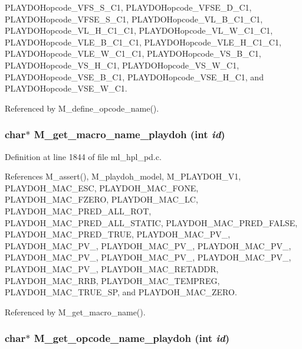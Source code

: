 PLAYDOHopcode\_\-VFS\_\-S\_\-C1, PLAYDOHopcode\_\-VFSE\_\-D\_\-C1, PLAYDOHopcode\_\-VFSE\_\-S\_\-C1, PLAYDOHopcode\_\-VL\_\-B\_\-C1\_\-C1, PLAYDOHopcode\_\-VL\_\-H\_\-C1\_\-C1, PLAYDOHopcode\_\-VL\_\-W\_\-C1\_\-C1, PLAYDOHopcode\_\-VLE\_\-B\_\-C1\_\-C1, PLAYDOHopcode\_\-VLE\_\-H\_\-C1\_\-C1, PLAYDOHopcode\_\-VLE\_\-W\_\-C1\_\-C1, PLAYDOHopcode\_\-VS\_\-B\_\-C1, PLAYDOHopcode\_\-VS\_\-H\_\-C1, PLAYDOHopcode\_\-VS\_\-W\_\-C1, PLAYDOHopcode\_\-VSE\_\-B\_\-C1, PLAYDOHopcode\_\-VSE\_\-H\_\-C1, and PLAYDOHopcode\_\-VSE\_\-W\_\-C1.

Referenced by M\_\-define\_\-opcode\_\-name().
\subsubsection{\setlength{\rightskip}{0pt plus 5cm}char$\ast$ M\_\-get\_\-macro\_\-name\_\-playdoh (int {\em id})}\label{ml__hpl__pd_8c_94f3726f92d0d5e66ebf3cb556f15ee5}




Definition at line 1844 of file ml\_\-hpl\_\-pd.c.

References M\_\-assert(), M\_\-playdoh\_\-model, M\_\-PLAYDOH\_\-V1, PLAYDOH\_\-MAC\_\-ESC, PLAYDOH\_\-MAC\_\-FONE, PLAYDOH\_\-MAC\_\-FZERO, PLAYDOH\_\-MAC\_\-LC, PLAYDOH\_\-MAC\_\-PRED\_\-ALL\_\-ROT, PLAYDOH\_\-MAC\_\-PRED\_\-ALL\_\-STATIC, PLAYDOH\_\-MAC\_\-PRED\_\-FALSE, PLAYDOH\_\-MAC\_\-PRED\_\-TRUE, PLAYDOH\_\-MAC\_\-PV\_, PLAYDOH\_\-MAC\_\-PV\_, PLAYDOH\_\-MAC\_\-PV\_, PLAYDOH\_\-MAC\_\-PV\_, PLAYDOH\_\-MAC\_\-PV\_, PLAYDOH\_\-MAC\_\-PV\_, PLAYDOH\_\-MAC\_\-PV\_, PLAYDOH\_\-MAC\_\-PV\_, PLAYDOH\_\-MAC\_\-RETADDR, PLAYDOH\_\-MAC\_\-RRB, PLAYDOH\_\-MAC\_\-TEMPREG, PLAYDOH\_\-MAC\_\-TRUE\_\-SP, and PLAYDOH\_\-MAC\_\-ZERO.

Referenced by M\_\-get\_\-macro\_\-name().
\subsubsection{\setlength{\rightskip}{0pt plus 5cm}char$\ast$ M\_\-get\_\-opcode\_\-name\_\-playdoh (int {\em id})}\label{ml__hpl__pd_8c_daeb434f560167a3cdbc02e359267527}




